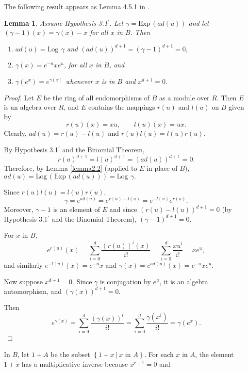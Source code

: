 \documentclass[mathscr]{amsart}
\theoremstyle{theorem}
\newtheorem{lemma}[theorem]{Lemma}
\theoremstyle{definition}
\numberwithin{equation}{section}
\def \({\left(}
\def \){\right)}
\def \Exp{\text{Exp}\,}
\def \Log{\text{Log}\,}
\begin{document}
The following result appears as Lemma 4.5.1 in \cite{Carter}.

\begin{lemma}\label{lemma2.3}
Assume Hypothesis 3.1$^\prime$. %
Let $\gamma=\Exp\(ad(u)\)$ and let $(\gamma-1)(x)=\gamma(x)-x$ for
all $x$ in $B$. Then
\begin{enumerate}
\item[(a)] $ad(u)=\Log\ \gamma$ and $\(ad(u)\)^{d+1}=(\gamma-1)^{d+1}=0,$
\item[(b)] $\gamma(x)=e^{-u}xe^u$, for all $x$ in $B$, and
\item[(c)] $\gamma(e^x)=e^{\gamma(x)}$ whenever $x$ is in $B$ and $x^{d+1}=0.$
\end{enumerate}
\end{lemma}

\begin{proof}
Let $E$ be the ring of all endomorphisms of $B$ as a module over
$R$. Then $E$ is an algebra over $R$, and $E$ contains the mappings
$r(u)$ and $l(u)$ on $B$ given by
$$r(u)(x)=xu,\qquad l(u)(x)=ux.$$
Clearly, $ad(u)=r(u)-l(u)$ and $r(u)l(u)=l(u)r(u)$.

By Hypothesis 3.1$^\prime$%
and the Binomial Theorem,
$$r(u)^{d+1}=l(u)^{d+1}=\(ad(u)\)^{d+1}=0.$$
Therefore, by Lemma \ref{lemma2.2} (applied to $E$ in place of $B$),
$ad(u)=\Log\(\Exp\(ad(u)\)\)=\Log\ \gamma.$

Since $r(u)l(u)=l(u)r(u)$,
$$\gamma=e^{ad(u)}=e^{r(u)-l(u)}=e^{-l(u)}e^{r(u)}.$$
Moreover, $\gamma-1$ is an element of $E$ and since
$\(r(u)-l(u)\)^{d+1}=0$ (by Hypothesis 3.1$^\prime$ and the Binomial
Theorem), $(\gamma-1)^{d+1}=0$.

For $x$ in $B$,
$$e^{r(u)}(x)=\sum_{i=0}^d \frac{\(r(u)\)^i(x)}{i!}=\sum_{i=0}^d \frac{xu^i}{i!}=xe^u,$$
and similarly $e^{-l(u)}(x)=e^{-u}x$ and
$\gamma(x)=e^{ad(u)}(x)=e^{-u}xe^u.$

Now suppose $x^{d+1}=0$. Since $\gamma$ is conjugation by $e^u$, it
is an algebra automorphism, and $\(\gamma(x)\)^{d+1}=0$.

Then
$$e^{\gamma(x)}=\sum_{i=0}^d \frac{\(\gamma(x)\)^i}{i!}=\sum_{i=0}^d \frac{\gamma\(x^i\)}{i!}=\gamma(e^x).$$
\end{proof}

%

In $B$, let $1+A$ be the subset $\left\{1+x\ |\ x \text{ in }
A\right\}$. For each $x$ in $A$, the element $1+x$ has a
multiplicative inverse because $x^{c+1}=0$ and
\end{document}
